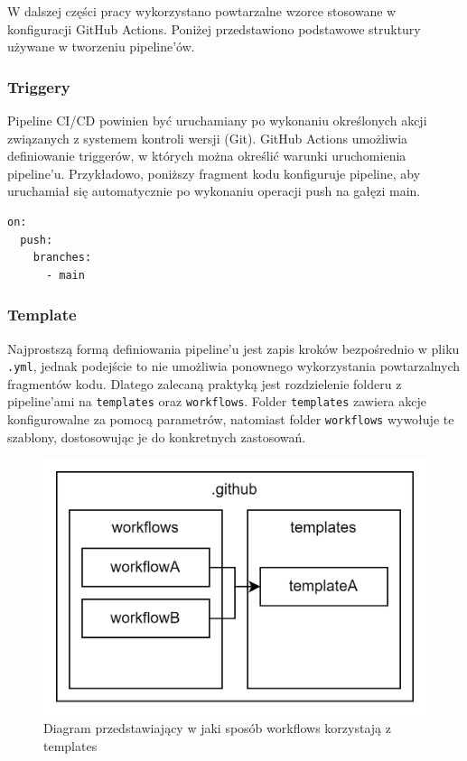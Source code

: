 \documentclass{article}
\begin{document}
W dalszej części pracy wykorzystano powtarzalne wzorce stosowane w konfiguracji GitHub Actions. Poniżej przedstawiono podstawowe struktury używane w tworzeniu pipeline’ów.

\subsubsection{Triggery}

Pipeline CI/CD powinien być uruchamiany po wykonaniu określonych akcji związanych z systemem kontroli wersji (Git). GitHub Actions umożliwia definiowanie triggerów, w których można określić warunki uruchomienia pipeline'u. Przykładowo, poniższy fragment kodu konfiguruje pipeline, aby uruchamiał się automatycznie po wykonaniu operacji push na gałęzi main.

\begin{lstlisting}[caption=Fragment kodu z triggerem ustawionym na push na main]
on:
  push:
    branches:
      - main
\end{lstlisting}


\subsubsection{Template}

Najprostszą formą definiowania pipeline’u jest zapis kroków bezpośrednio w pliku \lstinline|.yml|, jednak podejście to nie umożliwia ponownego wykorzystania powtarzalnych fragmentów kodu. Dlatego zalecaną praktyką jest rozdzielenie folderu z pipeline'ami na \lstinline|templates| oraz \lstinline|workflows|. Folder \lstinline|templates| zawiera akcje konfigurowalne za pomocą parametrów, natomiast folder \lstinline|workflows| wywołuje te szablony, dostosowując je do konkretnych zastosowań.

\begin{figure}[H]
    \centering
    \includegraphics[width=0.5\linewidth]{templatesAndWorkflows.png}
    \caption{Diagram przedstawiający w jaki sposób workflows korzystają z templates}
    \label{fig:enter-label}
\end{figure}
\end{document}
